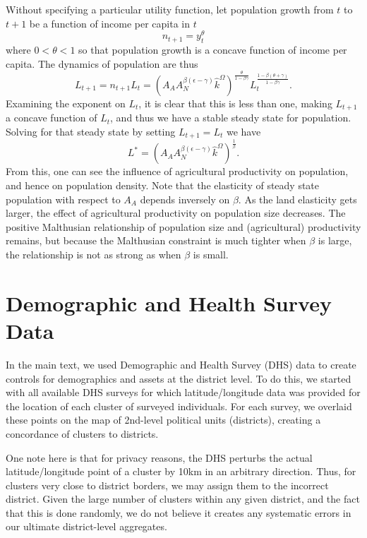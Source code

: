 \documentclass[11pt]{article}
\begin{document}
Without specifying a particular utility function, let population growth from $t$ to $t+1$ be a function of income per capita in $t$
\begin{equation}
    n_{t+1} = y_t^{\theta} \nonumber
\end{equation}
where $0<\theta<1$ so that population growth is a concave function of income per capita. The dynamics of population are thus
\begin{equation}
    L_{t+1} = n_{t+1} L_t = \left(A_A A_N^{\beta(\epsilon-\gamma)}\hat{k}^{\Omega}\right)^{\frac{\theta}{1-\beta\gamma}} L_t^{\frac{1-\beta(\theta+\gamma)}{1-\beta\gamma}}. \nonumber
\end{equation}
Examining the exponent on $L_t$, it is clear that this is less than one, making $L_{t+1}$ a concave function of $L_t$, and thus we have a stable steady state for population. Solving for that steady state by setting $L_{t+1} = L_t$ we have
\begin{equation}
    L^{\ast} = \left(A_A A_N^{\beta(\epsilon-\gamma)}\hat{k}^{\Omega}\right)^{\frac{1}{\beta}}. \nonumber
\end{equation}
From this, one can see the influence of agricultural productivity on population, and hence on population density. Note that the elasticity of steady state population with respect to $A_A$ depends inversely on $\beta$. As the land elasticity gets larger, the effect of agricultural productivity on population size decreases. The positive Malthusian relationship of population size and (agricultural) productivity remains, but because the Malthusian constraint is much tighter when $\beta$ is large, the relationship is not as strong as when $\beta$ is small. 

\section{Demographic and Health Survey Data}
In the main text, we used Demographic and Health Survey (DHS) data to create controls for demographics and assets at the district level. To do this, we started with all available DHS surveys for which latitude/longitude data was provided for the location of each cluster of surveyed individuals. For each survey, we overlaid these points on the map of 2nd-level political units (districts), creating a concordance of clusters to districts. 

One note here is that for privacy reasons, the DHS perturbs the actual latitude/longitude point of a cluster by 10km in an arbitrary direction. Thus, for clusters very close to district borders, we may assign them to the incorrect district. Given the large number of clusters within any given district, and the fact that this is done randomly, we do not believe it creates any systematic errors in our ultimate district-level aggregates. 
\end{document}
